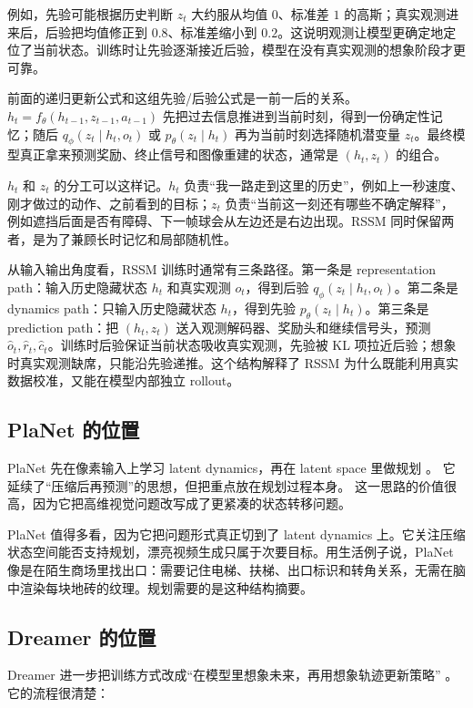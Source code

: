 \documentclass[11pt,a4paper]{ctexart}
\begin{document}
例如，先验可能根据历史判断 $z_t$ 大约服从均值 $0$、标准差 $1$ 的高斯；真实观测进来后，后验把均值修正到 $0.8$、标准差缩小到 $0.2$。这说明观测让模型更确定地定位了当前状态。训练时让先验逐渐接近后验，模型在没有真实观测的想象阶段才更可靠。

前面的递归更新公式和这组先验/后验公式是一前一后的关系。$h_t=f_\theta(h_{t-1},z_{t-1},a_{t-1})$ 先把过去信息推进到当前时刻，得到一份确定性记忆；随后 $q_\phi(z_t\mid h_t,o_t)$ 或 $p_\theta(z_t\mid h_t)$ 再为当前时刻选择随机潜变量 $z_t$。最终模型真正拿来预测奖励、终止信号和图像重建的状态，通常是 $(h_t,z_t)$ 的组合。

$h_t$ 和 $z_t$ 的分工可以这样记。$h_t$ 负责“我一路走到这里的历史”，例如上一秒速度、刚才做过的动作、之前看到的目标；$z_t$ 负责“当前这一刻还有哪些不确定解释”，例如遮挡后面是否有障碍、下一帧球会从左边还是右边出现。RSSM 同时保留两者，是为了兼顾长时记忆和局部随机性。

从输入输出角度看，RSSM 训练时通常有三条路径。第一条是 representation path：输入历史隐藏状态 $h_t$ 和真实观测 $o_t$，得到后验 $q_\phi(z_t\mid h_t,o_t)$。第二条是 dynamics path：只输入历史隐藏状态 $h_t$，得到先验 $p_\theta(z_t\mid h_t)$。第三条是 prediction path：把 $(h_t,z_t)$ 送入观测解码器、奖励头和继续信号头，预测 $\hat{o}_t,\hat{r}_t,\hat{c}_t$。训练时后验保证当前状态吸收真实观测，先验被 KL 项拉近后验；想象时真实观测缺席，只能沿先验递推。这个结构解释了 RSSM 为什么既能利用真实数据校准，又能在模型内部独立 rollout。

\subsection{PlaNet 的位置}

PlaNet 先在像素输入上学习 latent dynamics，再在 latent space 里做规划 \cite{hafner2019planet}。
它延续了“压缩后再预测”的思想，但把重点放在规划过程本身。
这一思路的价值很高，因为它把高维视觉问题改写成了更紧凑的状态转移问题。

PlaNet 值得多看，因为它把问题形式真正切到了 latent dynamics 上。它关注压缩状态空间能否支持规划，漂亮视频生成只属于次要目标。用生活例子说，PlaNet 像是在陌生商场里找出口：需要记住电梯、扶梯、出口标识和转角关系，无需在脑中渲染每块地砖的纹理。规划需要的是这种结构摘要。

\subsection{Dreamer 的位置}

Dreamer 进一步把训练方式改成“在模型里想象未来，再用想象轨迹更新策略” \cite{hafner2020dreamer}。
它的流程很清楚：
\end{document}
